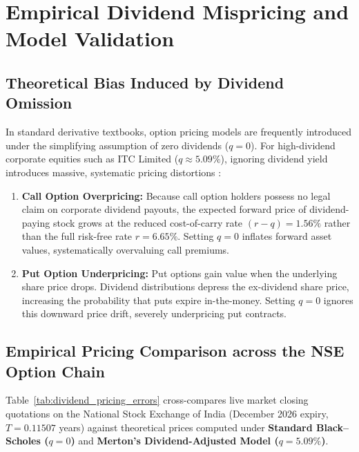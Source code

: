 
\section{Empirical Dividend Mispricing and Model Validation}
\label{sec:dividend_mispricing}

\subsection{Theoretical Bias Induced by Dividend Omission}

In standard derivative textbooks, option pricing models are frequently introduced under the simplifying assumption of zero dividends ($q = 0$). For high-dividend corporate equities such as ITC Limited ($q \approx 5.09\%$), ignoring dividend yield introduces massive, systematic pricing distortions \citep{hull2018options}:
\begin{enumerate}[leftmargin=1.5em, itemsep=1pt, parsep=0pt, label=(\roman*)]
    \item \textbf{Call Option Overpricing:} Because call option holders possess no legal claim on corporate dividend payouts, the expected forward price of dividend-paying stock grows at the reduced cost-of-carry rate $(r - q) = 1.56\%$ rather than the full risk-free rate $r = 6.65\%$. Setting $q = 0$ inflates forward asset values, systematically overvaluing call premiums.
    \item \textbf{Put Option Underpricing:} Put options gain value when the underlying share price drops. Dividend distributions depress the ex-dividend share price, increasing the probability that puts expire in-the-money. Setting $q = 0$ ignores this downward price drift, severely underpricing put contracts.
\end{enumerate}

\subsection{Empirical Pricing Comparison across the NSE Option Chain}

Table~\ref{tab:dividend_pricing_errors} cross-compares live market closing quotations on the National Stock Exchange of India (December 2026 expiry, $T = 0.11507$ years) against theoretical prices computed under \textbf{Standard Black--Scholes ($q = 0$)} and \textbf{Merton's Dividend-Adjusted Model ($q = 5.09\%$)}.

